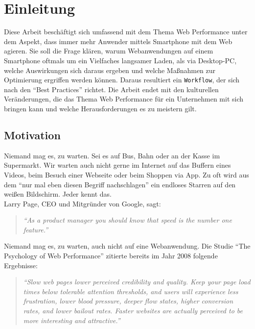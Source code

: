 \setcounter{page}{1}

\section{Einleitung} %
\label{sec:einleitung}
	Diese Arbeit beschäftigt sich umfassend mit dem Thema Web Performance unter dem Aspekt, dass immer mehr Anwender mittels Smartphone mit dem Web agieren. Sie soll die Frage klären, warum Webanwendungen auf einem Smartphone oftmals um ein Vielfaches langsamer Laden, als via Desktop-PC, welche Auswirkungen sich daraus ergeben und welche Maßnahmen zur Optimierung ergriffen werden können. Daraus resultiert ein \texttt{Workflow}, der sich nach den "`Best Practices"' richtet. Die Arbeit endet mit den kulturellen Veränderungen, die das Thema Web Performance für ein Unternehmen mit sich bringen kann und welche Herausforderungen es zu meistern gilt.

	\subsection{Motivation} %
	\label{sub:motivation}

		Niemand mag es, zu warten. Sei es auf Bus, Bahn oder an der Kasse im Supermarkt. Wir warten auch nicht gerne im Internet auf das Buffern eines Videos, beim Besuch einer Webseite oder beim Shoppen via App. Zu oft wird aus dem "`nur mal eben diesen Begriff nachschlagen"' ein endloses Starren auf den weißen Bildschirm. Jeder kennt das.\\

		Larry Page, CEO und Mitgründer von Google, sagt:
		\begin{quote}
			\textit{"`As a product manager you should know that speed is the number one feature."'}\autocite{holzle10}
		\end{quote}
		Niemand mag es, zu warten, auch nicht auf eine Webanwendung. Die Studie "`The Psychology of Web Performance"' zitierte bereits im Jahr 2008 folgende Ergebnisse:

		\begin{quote}\itshape
			"`Slow web pages lower perceived credibility and quality. Keep your page load times below tolerable attention thresholds, and users will experience less frustration, lower blood pressure, deeper flow states, higher conversion rates, and lower bailout rates. Faster websites are actually perceived to be more interesting and attractive."' \autocite{webOpti08}
		\end{quote}

